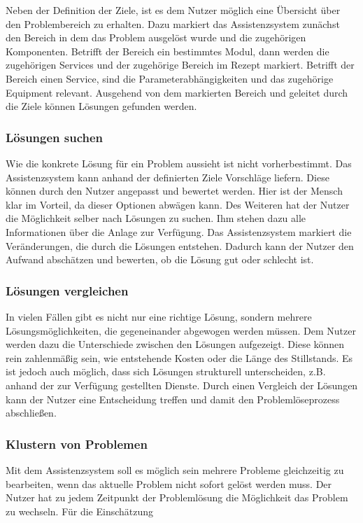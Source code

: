 Neben der Definition der Ziele, ist es dem Nutzer möglich eine Übersicht über den Problembereich zu erhalten. Dazu markiert das Assistenzsystem zunächst den Bereich in dem das Problem ausgelöst wurde und die zugehörigen Komponenten. Betrifft der Bereich ein bestimmtes Modul, dann werden die zugehörigen Services und der zugehörige Bereich im Rezept markiert. Betrifft der Bereich einen Service, sind die Parameterabhängigkeiten und das zugehörige Equipment relevant. Ausgehend von dem markierten Bereich und geleitet durch die Ziele können Lösungen gefunden werden.

\subsubsection*{Lösungen suchen}
Wie die konkrete Lösung für ein Problem aussieht ist nicht vorherbestimmt. Das Assistenzsystem kann anhand der definierten Ziele Vorschläge liefern. Diese können durch den Nutzer angepasst und bewertet werden. Hier ist der Mensch klar im Vorteil, da dieser Optionen abwägen kann. Des Weiteren hat der Nutzer die Möglichkeit selber nach Lösungen zu suchen. Ihm stehen dazu alle Informationen über die Anlage zur Verfügung. Das Assistenzsystem markiert die Veränderungen, die durch die Lösungen entstehen. Dadurch kann der Nutzer den Aufwand abschätzen und bewerten, ob die Lösung gut oder schlecht ist.

\subsubsection*{Lösungen vergleichen}
In vielen Fällen gibt es nicht nur eine richtige Lösung, sondern mehrere Lösungsmöglichkeiten, die gegeneinander abgewogen werden müssen. Dem Nutzer werden dazu die Unterschiede zwischen den Lösungen aufgezeigt. Diese können rein zahlenmäßig sein, wie entstehende Kosten oder die Länge des Stillstands. Es ist jedoch auch möglich, dass sich Lösungen strukturell unterscheiden, z.B. anhand der zur Verfügung gestellten Dienste. Durch einen Vergleich der Lösungen kann der Nutzer eine Entscheidung treffen und damit den Problemlöseprozess abschließen.

\subsubsection*{Klustern von Problemen}
Mit dem Assistenzsystem soll es möglich sein mehrere Probleme gleichzeitig zu bearbeiten, wenn das aktuelle Problem nicht sofort gelöst werden muss. Der Nutzer hat zu jedem Zeitpunkt der Problemlösung die Möglichkeit das Problem zu wechseln. Für die Einschätzung 

